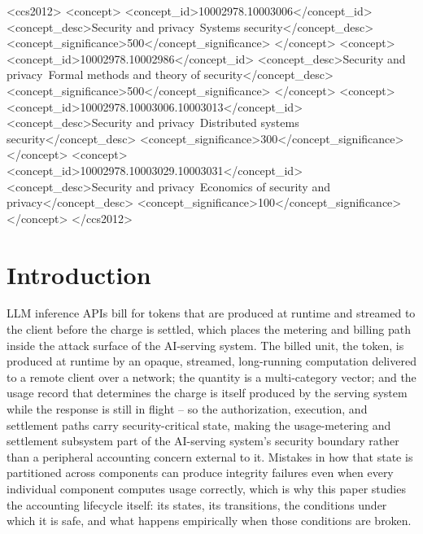 \documentclass[manuscript,review]{acmart}
\begin{document}
\begin{CCSXML}
<ccs2012>
<concept>
<concept_id>10002978.10003006</concept_id>
<concept_desc>Security and privacy~Systems security</concept_desc>
<concept_significance>500</concept_significance>
</concept>
<concept>
<concept_id>10002978.10002986</concept_id>
<concept_desc>Security and privacy~Formal methods and theory of security</concept_desc>
<concept_significance>500</concept_significance>
</concept>
<concept>
<concept_id>10002978.10003006.10003013</concept_id>
<concept_desc>Security and privacy~Distributed systems security</concept_desc>
<concept_significance>300</concept_significance>
</concept>
<concept>
<concept_id>10002978.10003029.10003031</concept_id>
<concept_desc>Security and privacy~Economics of security and privacy</concept_desc>
<concept_significance>100</concept_significance>
</concept>
</ccs2012>
\end{CCSXML}



\maketitle

\section{Introduction}
\label{sec:intro}
LLM inference APIs bill for tokens that are produced at runtime and streamed to the
client before the charge is settled, which places the metering and billing path inside
the attack surface of the AI-serving system. The billed unit, the
token, is produced at runtime by an opaque, streamed, long-running computation delivered
to a remote client over a network; the quantity is a multi-category vector; and the
usage record that determines the charge is itself produced by the serving system while
the response is still in flight -- so the authorization, execution, and settlement paths
carry security-critical state, making the usage-metering and settlement
subsystem part of the AI-serving system's security boundary rather than a peripheral
accounting concern external to it. Mistakes in how that state is
partitioned across components can produce integrity failures even when every individual
component computes usage correctly, which is why this paper studies the accounting
lifecycle itself: its states, its transitions, the conditions under which it is safe, and
what happens empirically when those conditions are broken.
\end{document}
